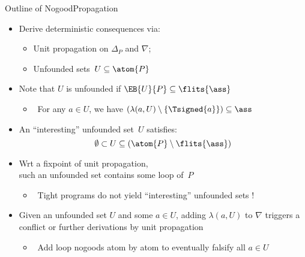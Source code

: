 \begin{frame}{Outline of {NogoodPropagation}}
\begin{itemize}
\item Derive deterministic consequences via:
  \begin{itemize}
  \item Unit propagation on $\Delta_P$ and $\nabla$;
  \item Unfounded sets~$U\subseteq\atom{P}$
  \end{itemize}
\item Note that $U$ is \alert{unfounded} if $\EB{U}{P}\subseteq\flits{\ass}$
  \begin{itemize}
  \item {} \  For any $a\in U$, we have $(\lambda(a,U)\setminus\{\Tsigned{a}\})\subseteq\ass$
  \end{itemize}
\pause
\item An ``interesting'' unfounded set~$U$ satisfies:
\[
  \emptyset\subset U \subseteq (\atom{P}\setminus\flits{\ass})
\]
\item Wrt a fixpoint of unit propagation,\\
\pause
      such an unfounded set contains some loop of~$P$
  \begin{itemize}
  \item {} \  Tight programs do not yield ``interesting'' unfounded sets !
  \end{itemize}
\pause
\item Given an unfounded set $U$ and some $a\in U$,
      adding $\lambda(a,U)$ to $\nabla$ triggers a conflict or
      further derivations by unit propagation
  \begin{itemize}
  \item {} \  Add loop nogoods atom by atom to eventually falsify all $a\in U$
  \end{itemize}
\end{itemize}
\end{frame}
\begin{frame}[shrink=15]%

\end{frame}
